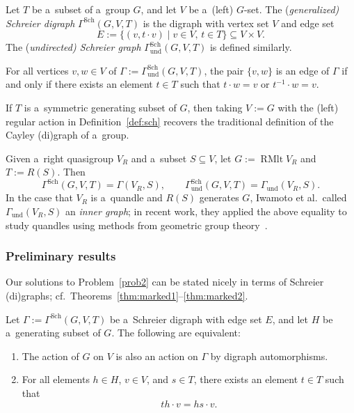 \documentclass{jonasart}
\DeclareMathOperator{\RMlt}{RMlt}
\newcommand{\inv}{^{-1}}
\newcommand{\Sch}{\mathrm{Sch}}
\newcommand{\und}{\mathrm{und}}
\begin{document}
	\begin{definition}\label{def:sch}
		Let $T$ be a~subset of a~group $G$, and let $V$ be a~(left) $G$-set. The (\emph{generalized\textup{)} Schreier digraph} $\Gamma^{\Sch}(G,V,T)$ is the digraph with vertex set $V$ and edge set
		\[
			E:=\{(v,t\cdot v)\mid v\in V,\, t\in T\}\subseteq V\times V.
		\]
		The (\emph{undirected\textup{)} Schreier graph} $\Gamma_{\und}^{\Sch}(G,V,T)$ is defined similarly.
	\end{definition}

	\begin{remark}\label{lem:cayley}
		For all vertices $v,w\in V$ of $\Gamma:=\Gamma_{\und}^{\Sch}(G,V,T)$, the pair $\{v,w\}$ is an edge of $\Gamma$ if and only if there exists an element $t\in T$ such that $t\cdot w=v$ or $t\inv\cdot w=v$.
	\end{remark}

	\begin{remark}
		If $T$ is a~symmetric generating subset of $G$, then taking $V:=G$ with the (left) regular action in Definition~\ref{def:sch} recovers the traditional definition of the Cayley (di)graph of a~group.
	\end{remark}

	\begin{remark}\label{rmk:sch}
		Given a~right quasigroup $V_R$ and a~subset $S\subseteq V$, let $G:=\RMlt V_R$ and ${T:=R(S)}$. Then
		\[
			\Gamma^{\Sch}(G,V,T)=\Gamma(V_R,S),\quad\quad \Gamma_{\und}^{\Sch}(G,V,T)=\Gamma_{\und}(V_R,S).
		\]
		In the case that $V_R$ is a~quandle and $R(S)$ generates $G$, Iwamoto et al.\ called $\Gamma_{\und}(V_R,S)$ an \emph{inner graph}; in recent work, they applied the above equality to study quandles using methods from geometric group theory~\cite[Section~3]{metrics}.
	\end{remark}
	
    \subsubsection{Preliminary results}
    
	Our solutions to Problem~\ref{prob2} can be stated nicely in terms of Schreier (di)graphs; cf.\ Theorems~\ref{thm:marked1}--\ref{thm:marked2}.
    
	\begin{proposition}\label{prop:sch1}
		Let $\Gamma:=\Gamma^{\Sch}(G,V,T)$ be a~Schreier digraph with edge set $E$, and let $H$ be a~generating subset of $G$. The following are equivalent:
		\begin{enumerate}
			\item The action of $G$ on $V$ is also an action on $\Gamma$ by digraph automorphisms.
			\item For all elements $h\in H$, $v\in V$, and $s\in T$, there exists an element $t\in T$ such that
			\begin{equation}\label{eq:sch}
				th\cdot v=hs\cdot v.
			\end{equation}
		\end{enumerate}
	\end{proposition}
\end{document}
